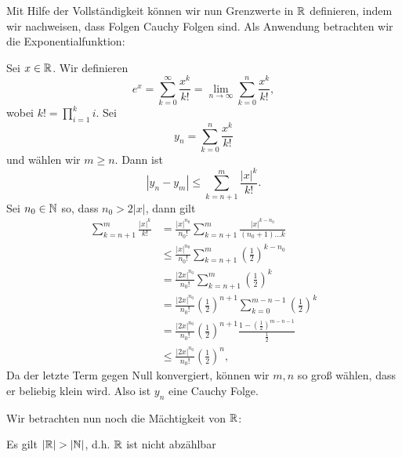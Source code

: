 Mit Hilfe der Vollständigkeit können wir nun Grenzwerte in \(\mathbb{R}\) definieren, indem wir nachweisen, dass Folgen Cauchy Folgen sind. Als Anwendung betrachten wir die Exponentialfunktion:
\label{grundlagen/zahlensysteme:example-25}
\begin{example}{}{}



Sei \(x \in \mathbb{R}\). Wir definieren
\begin{equation*}
 e^x = \sum_{k=0}^\infty \frac{x^k}{k!} = \lim_{n \rightarrow \infty} \sum_{k=0}^n \frac{x^k}{k!},
\end{equation*}
wobei \(k! = \prod_{i=1}^k i\). Sei
\begin{equation*}
y_n = \sum_{k=0}^n \frac{x^k}{k!}
\end{equation*}
und wählen wir \(m \geq n\). Dann ist
\begin{equation*}
|y_n - y_m| \leq \sum_{k=n+1}^m \frac{|x|^k}{k!}.
\end{equation*}
Sei \(n_0 \in \mathbb{N}\) so, dass \(n_0 > 2{|x|} \), dann gilt
\begin{align*}
\sum_{k=n+1}^m \frac{|x|^k}{k!} &= \frac{|x|^{n_0}}{n_0!} \sum_{k=n+1}^m \frac{|x|^{k-n_0}}{(n_0+1)\ldots k} \\
&\leq \frac{|x|^{n_0}}{n_0!} \sum_{k=n+1}^m \left(\frac{1}2\right)^{k-n_0} \\
&= \frac{|2x|^{n_0}}{n_0!} \sum_{k=n+1}^m \left(\frac{1}2\right)^{k} \\
&= \frac{|2x|^{n_0}}{n_0!} \left(\frac{1}2\right)^{n+1} \sum_{k=0}^{m-n-1} \left(\frac{1}2\right)^{k} \\
&= \frac{|2x|^{n_0}}{n_0!} \left(\frac{1}2\right)^{n+1} \frac{1-\left(\frac{1}2\right)^{m-n-1}}{\frac{1}2} \\
&\leq \frac{|2x|^{n_0}}{n_0!} \left(\frac{1}2\right)^{n},
\end{align*}
Da der letzte Term gegen Null konvergiert, können wir \(m,n\) so groß wählen, dass er beliebig klein wird. Also ist \(y_n\) eine Cauchy Folge.
\end{example}

Wir betrachten nun noch die Mächtigkeit von \(\mathbb{R}\):
\label{grundlagen/zahlensysteme:theorem-26}
\begin{theorem}{}{}



Es gilt \(|\mathbb{R}| > |\mathbb{N}|\), d.h. \(\mathbb{R}\) ist nicht abzählbar
\end{theorem}

